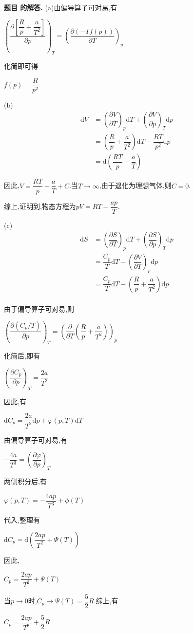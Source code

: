 \documentclass[12pt, a4paper, oneside]{ctexart}
\newcounter{problemname}
\newenvironment{solution}
  {\par\noindent\textbf{题目 \theproblemname 的解答. }}
  {\par}
\newcommand{\tpar}[3]{\left(\dfrac{\partial #1}{\partial #2}\right)_{#3}}
\begin{document}
\begin{solution}
  (a)由偏导算子可对易,有

  \centerline{$\tpar{\left[\dfrac{R}{p}+\dfrac{a}{T^2}\right]}{p}{T} = \tpar{\left(- T f(p)\right)}{T}{p}$}

  化简即可得

  \centerline{$f(p) = \dfrac{R}{p^2}$}

  (b)
  \begin{align*}
    \mathrm{d}V &= \tpar{V}{T}{p} \mathrm{d}T + \tpar{V}{p}{T} \mathrm{d}p \\
    &= \left(\dfrac{R}{p}+\dfrac{a}{T^2} \right)\mathrm{d}T - \dfrac{RT}{p^2} \mathrm{d}p \\
    &= \mathrm{d} \left(\dfrac{RT}{p} - \dfrac{a}{T}\right)
  \end{align*}

  因此,$V = \dfrac{RT}{p} - \dfrac{a}{T} + C$.当$T \to \infty$,由于退化为理想气体,则$C = 0$.

  综上,证明到,物态方程为$pV = RT - \dfrac{ap}{T}$.

  (c)
  \begin{align*}
    \mathrm{d}S &= \tpar{S}{T}{p} \mathrm{d} T + \tpar{S}{p}{T} \mathrm{d} p \\
    &= \dfrac{C_p}{T} \mathrm{d}T - \tpar{V}{T}{p} \mathrm{d}p \\
    &= \dfrac{C_p}{T} \mathrm{d}T - \left(\dfrac{R}{p} +\dfrac{a}{T^2}\right) \mathrm{d}p \\
  \end{align*}

  由于偏导算子可对易,则

  \centerline{$\tpar{(C_p/T)}{p}{T} = \left( \dfrac{\partial}{\partial T} \left(\dfrac{R}{p} +\dfrac{a}{T^2}\right)\right)_p$}

  化简后,即有

  \centerline{$\tpar{C_p}{p}{T} = \dfrac{2a}{T^2}$}

  因此,有

  \centerline{$\mathrm{d} C_p = \dfrac{2a}{T^2} \mathrm{d}p + \varphi(p,T) \mathrm{d}T$}

  由偏导算子可对易,有

  \centerline{$-\dfrac{4a}{T^3} = \tpar{\varphi}{p}{T}$}

  两侧积分后,有
  
  \centerline{$\varphi(p,T) = -\dfrac{4ap}{T^3} + \phi(T)$}

  代入,整理有

  \centerline{$\mathrm{d}C_p = \mathrm{d}\left(\dfrac{2ap}{T^2} + \Psi(T)\right) $}

  因此,

  \centerline{$C_p = \dfrac{2ap}{T^2} + \varPsi(T)$}

  当$p \to 0$时,$C_p \to \varPsi(T) = \dfrac{5}{2}R$.综上,有

  \centerline{$C_p = \dfrac{2ap}{T^2} + \dfrac{5}{2}R$}
\end{solution}
\end{document}
